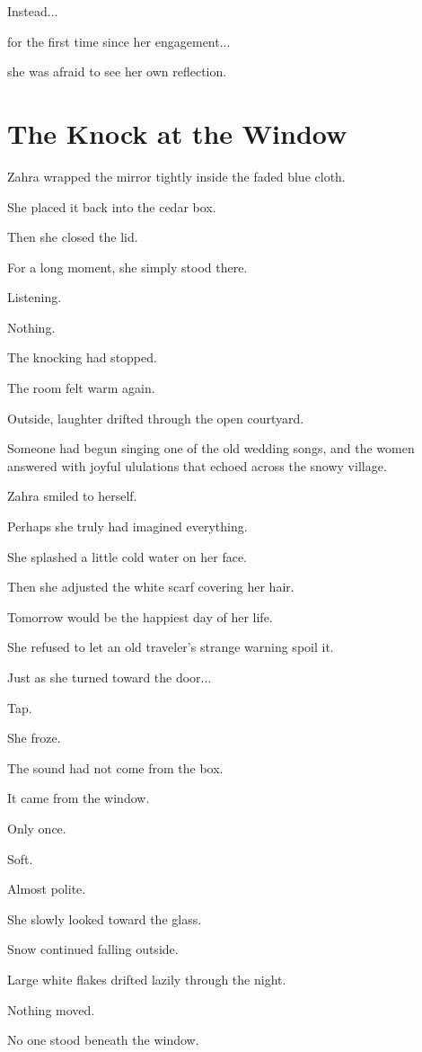\documentclass[12pt,openany]{book}
\begin{document}
Instead...

for the first time since her engagement...

she was afraid to see her own reflection.
\section*{The Knock at the Window}

Zahra wrapped the mirror tightly inside the faded blue cloth.

She placed it back into the cedar box.

Then she closed the lid.

For a long moment, she simply stood there.

Listening.

Nothing.

The knocking had stopped.

The room felt warm again.

Outside, laughter drifted through the open courtyard.

Someone had begun singing one of the old wedding songs, and the women answered with joyful ululations that echoed across the snowy village.

Zahra smiled to herself.

Perhaps she truly had imagined everything.

She splashed a little cold water on her face.

Then she adjusted the white scarf covering her hair.

Tomorrow would be the happiest day of her life.

She refused to let an old traveler's strange warning spoil it.

Just as she turned toward the door...

Tap.

She froze.

The sound had not come from the box.

It came from the window.

Only once.

Soft.

Almost polite.

She slowly looked toward the glass.

Snow continued falling outside.

Large white flakes drifted lazily through the night.

Nothing moved.

No one stood beneath the window.
\end{document}
